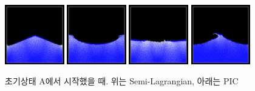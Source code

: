 \documentclass[12pt, A4]{article}
\begin{document}
\begin{figure}[h!]
\includegraphics[width=0.23\textwidth]{pic-state-a/img1}
\includegraphics[width=0.23\textwidth]{pic-state-a/img2}
\includegraphics[width=0.23\textwidth]{pic-state-a/img3}
\includegraphics[width=0.23\textwidth]{pic-state-a/img4}
  \caption{초기상태 A에서 시작했을 때. 위는 Semi-Lagrangian, 아래는 PIC}
  \label{fluid-a}
\end{figure}
\end{document}
